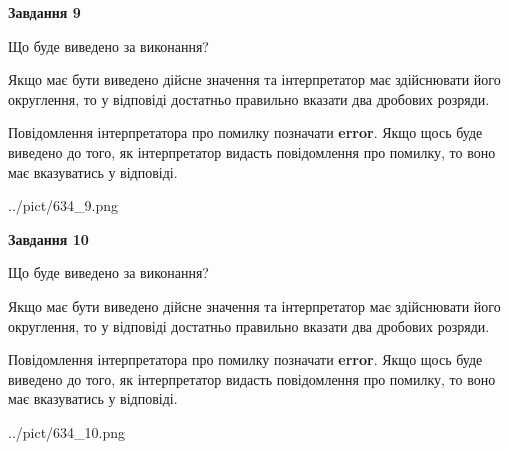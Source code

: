 \documentclass[12pt, ukrainian]{article}
\begin{document}
{\begin {Large}
{\begin {center}\textbf{Завдання 9}\end {center}}\par
Що буде виведено за виконання? \par

Якщо має бути виведено дійсне значення та інтерпретатор має здійснювати його округлення, 
то у відповіді достатньо правильно вказати два дробових розряди.

Повідомлення інтерпретатора про помилку позначати \textbf{error}.
Якщо щось буде виведено до того, як інтерпретатор видасть повідомлення про помилку, 
то воно має вказуватись у відповіді. \par

\begin{center}
	{../pict/634_9.png}
\end{center}
\newpage

{\begin {center}\textbf{Завдання 10}\end {center}}\par
Що буде виведено за виконання? \par

Якщо має бути виведено дійсне значення та інтерпретатор має здійснювати його округлення, 
то у відповіді достатньо правильно вказати два дробових розряди.

Повідомлення інтерпретатора про помилку позначати \textbf{error}.
Якщо щось буде виведено до того, як інтерпретатор видасть повідомлення про помилку, 
то воно має вказуватись у відповіді. \par

\begin{center}
	{../pict/634_10.png}
\end{center}
\newpage

\end {Large}}
\end{document}
